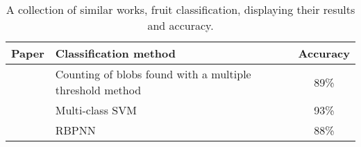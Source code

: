 \documentclass[../main.tex]{subfile}
\begin{document}
\begin{table}[htb]
    \begin{minipage}{\linewidth}
        \caption{A collection of similar works, fruit classification, displaying their results and accuracy.}
        \label{tab:related-work}

        \centering
        \begin{tabularx}{.9\linewidth}{ c >{\centering\arraybackslash}X c }
            \toprule
            \textbf{Paper}  & \textbf{Classification method}                           & \textbf{Accuracy} \\
            \midrule
            \cite{II-item1} & Counting of blobs found with a multiple threshold method & 89\%              \\
            \cite{II-item7} & Multi-class SVM                                          & 93\%              \\
            \cite{II-item8} & RBPNN                                                    & 88\%              \\
            \bottomrule
        \end{tabularx}
    \end{minipage}
\end{table}
\end{document}
